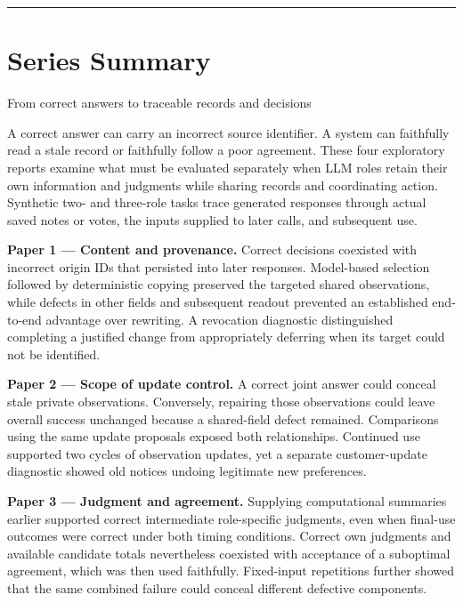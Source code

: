 \documentclass[10pt,a4paper]{article}
\begin{document}
\vfill\hrule\vspace{9pt}{\sffamily\small Four experimental reports and a concluding design synthesis.\par}
\clearpage\section{Series Summary}\label{series-summary}
{\sffamily\color{teal}\large From correct answers to traceable records and decisions\par}\medskip
A correct answer can carry an incorrect source identifier. A system can faithfully read a stale record or faithfully follow a poor agreement. These four exploratory reports examine what must be evaluated separately when LLM roles retain their own information and judgments while sharing records and coordinating action. Synthetic two- and three-role tasks trace generated responses through actual saved notes or votes, the inputs supplied to later calls, and subsequent use.

\textbf{Paper 1 — Content and provenance.} Correct decisions coexisted with incorrect origin IDs that persisted into later responses. Model-based selection followed by deterministic copying preserved the targeted shared observations, while defects in other fields and subsequent readout prevented an established end-to-end advantage over rewriting. A revocation diagnostic distinguished completing a justified change from appropriately deferring when its target could not be identified.

\textbf{Paper 2 — Scope of update control.} A correct joint answer could conceal stale private observations. Conversely, repairing those observations could leave overall success unchanged because a shared-field defect remained. Comparisons using the same update proposals exposed both relationships. Continued use supported two cycles of observation updates, yet a separate customer-update diagnostic showed old notices undoing legitimate new preferences.

\textbf{Paper 3 — Judgment and agreement.} Supplying computational summaries earlier supported correct intermediate role-specific judgments, even when final-use outcomes were correct under both timing conditions. Correct own judgments and available candidate totals nevertheless coexisted with acceptance of a suboptimal agreement, which was then used faithfully. Fixed-input repetitions further showed that the same combined failure could conceal different defective components.
\end{document}
